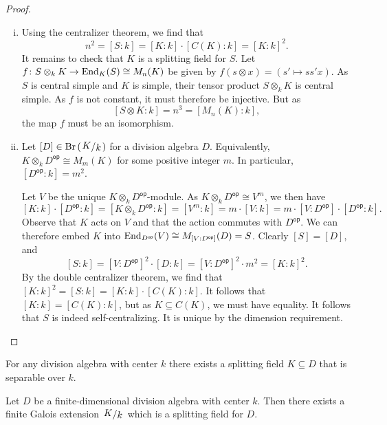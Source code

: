 \begin{proof}
\phantom{i}
\begin{enumerate}[i)]
\item Using the centralizer theorem, we find that
\[
n^2 = [S : k] = [K : k] \cdot [C(K) : k] = [K : k]^2.
\]
It remains to check that $K$ is a splitting field for $S$. Let
$f \colon S \otimes_k K \to \operatorname{End}_K(S) \cong M_n(K)$ be given by
$f(s \otimes x) = (s' \mapsto s s' x)$. As $S$ is central simple
and $K$ is simple, their tensor product $S \otimes_k K$ is central
simple. As $f$ is not constant, it must therefore be injective. But
as
\[
[S \otimes K : k] = n^3 = [M_n(K) : k],
\]
the map $f$ must be an isomorphism.
\item Let $[D] \in \Br \br{\kvoc{K}{k}}$ for a division algebra
$D$. Equivalently, $K \otimes_k D^{\mathsf{op}} \cong M_m(K)$ for
some positive integer $m$. In particular,
$[D^{\mathsf{op}} : k] = m^2$.

Let $V$ be the unique $K \otimes_k D^{\mathsf{op}}$-module. As
$K \otimes_k D^{\mathsf{op}} \cong V^m$, we then have
\[
[K : k] \cdot [D^{\mathsf{op}} : k] =
[K \otimes_k D^{\mathsf{op}} : k] =
[V^m : k] =
m \cdot [V : k] =
m \cdot [V : D^{\mathsf{op}}] \cdot [D^{\mathsf{op}} : k].
\]
Observe that $K$ acts on $V$ and that the action commutes with
$D^{\mathsf{op}}$. We can therefore embed $K$ into
$\operatorname{End}_{D^{\mathsf{op}}}(V) \cong M_{[V : D^{\mathsf{op}}]}(D) = S$.
Clearly $[S] = [D]$, and
\[
[S : k] =
[V : D^{\mathsf{op}}]^2 \cdot [D : k] =
[V : D^{\mathsf{op}}]^2 \cdot m^2 =
[K : k]^2.
\]
By the double centralizer theorem, we find that
$[K : k]^2 = [S : k] = [K : k] \cdot [C(K) : k]$. It follows that
$[K : k] = [C(K) : k]$, but as $K \subseteq C(K)$, we must have
equality. It follows that $S$ is indeed self-centralizing. It is
unique by the dimension requirement. \qedhere
\end{enumerate}
\end{proof}

\begin{opomba}
For any division algebra with center $k$ there exists a splitting
field $K \subseteq D$ that is separable over $k$.
\end{opomba}

\begin{posledica}
Let $D$ be a finite-dimensional division algebra with center $k$.
Then there exists a finite Galois extension $\kvoc{K}{k}$ which is
a splitting field for $D$.
\end{posledica}

